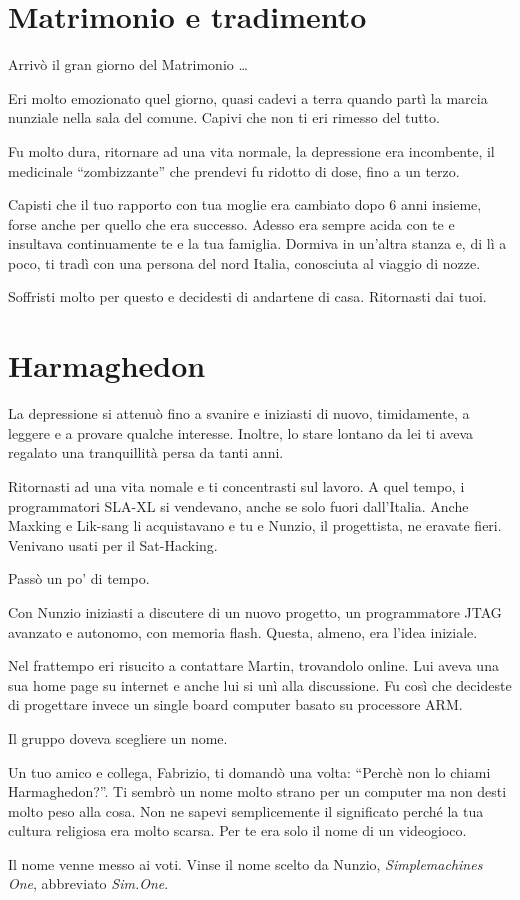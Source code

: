 \section{Matrimonio e tradimento}
\label{matrimonio_e_tradimento}

Arrivò il gran giorno del Matrimonio \ldots

Eri molto emozionato quel giorno, quasi cadevi a terra quando partì la marcia nunziale nella sala del comune. Capivi che non ti eri rimesso del tutto.

Fu molto dura, ritornare ad una vita normale, la depressione era incombente, il medicinale ``zombizzante'' che prendevi fu ridotto di dose, fino a un terzo.

Capisti che il tuo rapporto con tua moglie era cambiato dopo 6 anni insieme, forse anche per quello che era successo. Adesso era sempre acida con te e insultava continuamente te e la tua famiglia. Dormiva in un'altra stanza e, di lì a poco, ti tradì con una persona del nord Italia, conosciuta al viaggio di nozze.

Soffristi molto per questo e decidesti di andartene di casa. Ritornasti dai tuoi.
 
\section{Harmaghedon}
\label{harmaghedon}
 
La depressione si attenuò fino a svanire e iniziasti di nuovo, timidamente, a leggere e a provare qualche interesse. Inoltre, lo stare lontano da lei ti aveva regalato una tranquillità persa da tanti anni.

Ritornasti ad una vita nomale e ti concentrasti sul lavoro. A quel tempo, i programmatori SLA-XL si vendevano, anche se solo fuori dall'Italia. Anche Maxking e Lik-sang li acquistavano e tu e Nunzio, il progettista, ne eravate fieri. Venivano usati per il Sat-Hacking.

Passò un po' di tempo.

Con Nunzio iniziasti a discutere di un nuovo progetto, un programmatore JTAG avanzato e autonomo, con memoria flash. Questa, almeno, era l'idea iniziale.

Nel frattempo eri risucito a contattare Martin, trovandolo online. Lui aveva una sua home page su internet e anche lui si unì alla discussione. Fu così che decideste di progettare invece un single board computer basato su processore ARM.

Il gruppo doveva scegliere un nome.

Un tuo amico e collega, Fabrizio, ti domandò una volta: “Perchè non lo chiami Harmaghedon?”. Ti sembrò un nome molto strano per un computer ma non desti molto peso alla cosa. Non ne sapevi semplicemente il significato perché la tua cultura religiosa era molto scarsa. Per te era solo il nome di un videogioco.

Il nome venne messo ai voti. Vinse il nome scelto da Nunzio, \textit{Simplemachines One}, abbreviato \textit{Sim.One}.
